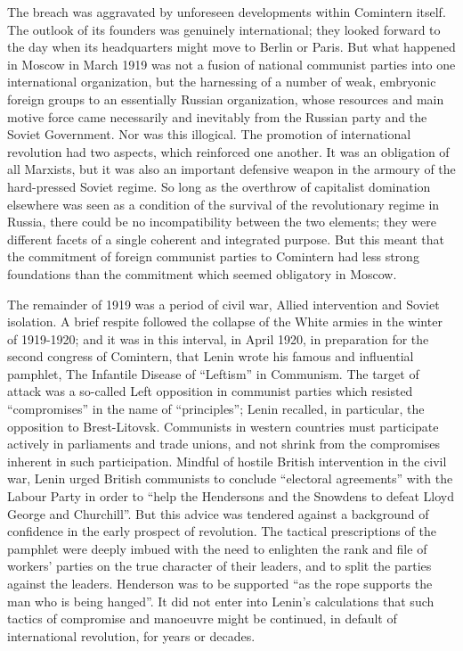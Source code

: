 The breach was aggravated by unforeseen developments within Comintern itself. The outlook of its founders was genuinely international; they looked forward to the day when its headquarters might move to Berlin or Paris. But what happened in Moscow in March 1919 was not a fusion of national communist parties into one international organization, but the harnessing of a number of weak, embryonic foreign groups to an essentially Russian organization, whose resources and main motive force came necessarily and inevitably from the Russian party and the Soviet Government. Nor was this illogical. The promotion of international revolution had two aspects, which reinforced one another. It was an obligation of all Marxists, but it was also an important defensive weapon in the armoury of the hard-pressed Soviet regime. So long as the overthrow of capitalist domination elsewhere was seen as a condition of the survival of the revolutionary regime in Russia, there could be no incompatibility between the two elements; they were different facets of a single coherent and integrated purpose. But this meant that the commitment of foreign communist parties to Comintern had less strong foundations than the commitment which seemed obligatory in Moscow. 

The remainder of 1919 was a period of civil war, Allied intervention and Soviet isolation. A brief respite followed the collapse of the White armies in the winter of 1919-1920; and it was in this interval, in April 1920, in preparation for the second congress of Comintern, that Lenin wrote his famous and influential pamphlet, The Infantile Disease of ``Leftism'' in Communism. The target of attack was a so-called Left opposition in communist parties which resisted ``compromises'' in the name of ``principles''; Lenin recalled, in particular, the opposition to Brest-Litovsk. Communists in western countries must participate actively in parliaments and trade unions, and not shrink from the compromises inherent in such participation. Mindful of hostile British intervention in the civil war, Lenin urged British communists to conclude ``electoral agreements'' with the Labour Party in order to ``help the Hendersons and the Snowdens to defeat Lloyd George and Churchill''. But this advice was tendered against a background of confidence in the early prospect of revolution. The tactical prescriptions of the pamphlet were deeply imbued with the need to enlighten the rank and file of workers' parties on the true character of their leaders, and to split the parties against the leaders. Henderson was to be supported ``as the rope supports the man who is being hanged''. It did not enter into Lenin's calculations that such tactics of compromise and manoeuvre might be continued, in default of international revolution, for years or decades. 

